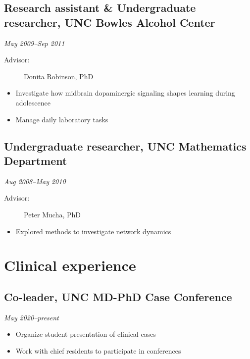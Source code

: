 \documentclass{article}
\newcommand{\dateformat}[1]{\textit{#1}}
\begin{document}
  \subsection*{Research assistant \& Undergraduate researcher, UNC Bowles Alcohol Center}
    \dateformat{May 2009--Sep 2011}
    \begin{description}
      \item[Advisor:] Donita Robinson, PhD
    \end{description}
    \begin{itemize}
      \item Investigate how midbrain dopaminergic signaling shapes learning during adolescence
      \item Manage daily laboratory tasks
    \end{itemize}

  \subsection*{Undergraduate researcher, UNC Mathematics Department}
    \dateformat{Aug 2008--May 2010}
    \begin{description}
      \item[Advisor:] Peter Mucha, PhD
    \end{description}
    \begin{itemize}
      \item Explored methods to investigate network dynamics
    \end{itemize}


\section*{Clinical experience}
  \subsection*{Co-leader, UNC MD-PhD Case Conference}
    \dateformat{May 2020--present}
    \begin{itemize}
      \item Organize student presentation of clinical cases
      \item Work with chief residents to participate in conferences
    \end{itemize}
\end{document}
